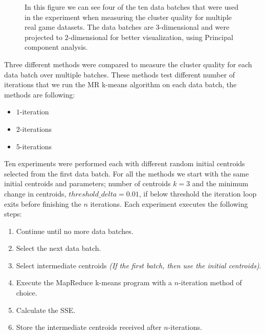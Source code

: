 \begin{figure}[ht!]
\begin{center}
{        }%
        \end{center}
    \caption{In this figure we can see four of the ten data batches that were used in the experiment when measuring the cluster quality for multiple real game datasets. The data batches are $3$-dimensional and were projected to $2$-dimensional for better visualization, using Principal component analysis.}
   \label{fig:realdatasubfigures}
\end{figure}

Three different methods were compared to measure the cluster quality for each data batch over multiple batches. These methods test different number of iterations that we run the MR k-means algorithm  on each data batch, the methods are following:
\begin{itemize}
\item $1$-iteration
\item $2$-iterations
\item $5$-iterations
\end{itemize}

Ten experiments were performed each with different random initial centroids selected from the first data batch. For all the methods we start with the same initial centroids and parameters; number of centroids $k=3$ and the minimum change in centroids, $threshold\_delta = 0.01$, if below threshold the iteration loop exits before finishing the $n$ iterations. Each experiment executes the following steps:
\begin{enumerate}
	\item Continue until no more data batches.
	\item Select the next data batch.
	\item Select intermediate centroids \textit{(If the first batch, then use the initial centroids)}.
	\item Execute the MapReduce k-means program with a $n$-iteration method of choice.
	\item Calculate the SSE.
	\item Store the intermediate centroids received after $n$-iterations.
\end{enumerate}

